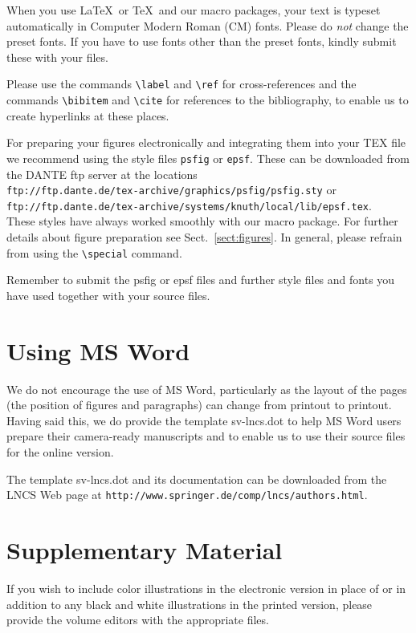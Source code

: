 \documentclass[a4paper]{llncs}
\begin{document}
When you use \LaTeX\ or \TeX\ and our macro packages, your text is
typeset automatically in Computer Modern Roman (CM) fonts. Please do
{\it not} change the preset fonts. If you have to use fonts other
than the preset fonts, kindly submit these with your files.

Please use the commands \verb+\label+ and \verb+\ref+ for
cross-references and the commands \verb+\bibitem+ and \verb+\cite+ for
references to the bibliography, to enable us to create hyperlinks at
these places.

For preparing your figures electronically and integrating them into
your TEX file we recommend using the style files \verb+psfig+ or
\verb+epsf+. These can be downloaded from the DANTE ftp server at the
locations\\
\indent \verb+ftp://ftp.dante.de/tex-archive/graphics/psfig/psfig.sty+
or\\ \indent
\verb+ftp://ftp.dante.de/tex-archive/systems/knuth/local/lib/epsf.tex+.\\
These styles have always worked smoothly with our macro package. For
further details about figure preparation see Sect.~\ref{sect:figures}.
In general, please refrain from using the \verb+\special+ command.

Remember to submit the psfig or epsf files and further style files and
fonts you have used together with your source files.


\section{Using MS Word}
\label{sect:Word}

We do not encourage the use of MS Word, particularly as the layout of
the pages (the position of figures and paragraphs) can change from
printout to printout. Having said this, we do provide the template
sv-lncs.dot to help MS Word users
prepare their camera-ready manuscripts and to
enable us to use their source files for the online version.

The template sv-lncs.dot and its documentation can be downloaded from
the LNCS Web page at
\verb+http://www.springer.de/comp/lncs/authors.html+.

\section{Supplementary Material}

If you wish to include color illustrations in the electronic
version in place of or in addition to any black and white illustrations
in the printed version, please provide the volume editors with the
appropriate files.
\end{document}
